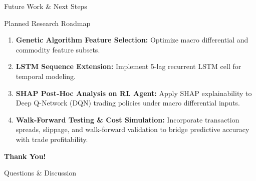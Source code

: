 \documentclass[aspectratio=169]{beamer}
\begin{document}
\begin{frame}{Future Work \& Next Steps}
	\begin{block}{Planned Research Roadmap}
		\begin{enumerate}
			\item \textbf{Genetic Algorithm Feature Selection:} Optimize macro differential and commodity feature subsets.
			\item \textbf{LSTM Sequence Extension:} Implement 5-lag recurrent LSTM cell for temporal modeling.
			\item \textbf{SHAP Post-Hoc Analysis on RL Agent:} Apply SHAP explainability to Deep Q-Network (DQN) trading policies under macro differential inputs.
			\item \textbf{Walk-Forward Testing \& Cost Simulation:} Incorporate transaction spreads, slippage, and walk-forward validation to bridge predictive accuracy with trade profitability.
		\end{enumerate}
	\end{block}
\end{frame}

\begin{frame}
	\begin{center}
		\Huge \color{iitiblue}\bfseries Thank You!
		
		\vspace{1cm}
		
		\Large Questions \& Discussion
	\end{center}
\end{frame}
\end{document}
